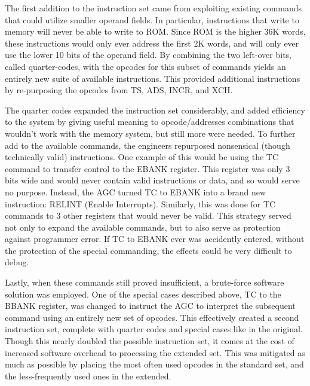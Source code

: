 \documentclass[a4paper,11pt]{article}
\begin{document}
The first addition to the instruction set came from exploiting existing commands that could utilize smaller operand fields.  In particular, instructions that write to memory will never be able to write to ROM. Since ROM is the higher 36K words, these instructions would only ever address the first 2K words, and will only ever use the lower 10 bits of the operand field. By combining the two left-over bits, called quarter-codes, with the opcodes for this subset of commands yields an entirely new suite of available instructions.  This provided additional instructions by re-purposing the opcodes from TS, ADS, INCR, and XCH.

The quarter codes expanded the instruction set considerably, and added efficiency to the system by giving useful meaning to opcode/addresses combinations that wouldn't work with the memory system, but still more were needed.  To further add to the available commands, the engineers repurposed nonsensical (though technically valid) instructions.  One example of this would be using the TC command to transfer control to the EBANK register.  This register was only 3 bits wide and would never contain valid instructions or data, and so would serve no purpose.  Instead, the AGC turned TC to EBANK into a brand new instruction: RELINT (Enable Interrupts).  Similarly, this was done for TC commands to 3 other registers that would never be valid.  This strategy served not only to expand the available commands, but to also serve as protection against programmer error.  If TC to EBANK ever was accidently entered, without the protection of the special commanding, the effects could be very difficult to debug.

Lastly, when these commands still proved insufficient, a brute-force software solution was employed.  One of the special cases described above, TC to the BBANK register, was changed to instruct the AGC to interpret the subsequent command using an entirely new set of opcodes.  This effectively created a second instruction set, complete with quarter codes and special cases like in the original.  Though this nearly doubled the possible instruction set, it comes at the cost of increased software overhead to processing the extended set.  This was mitigated as much as possible by placing the most often used opcodes in the standard set, and the less-frequently used ones in the extended.
\end{document}
